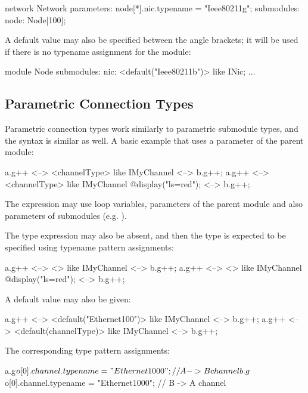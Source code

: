 \begin{ned}
network Network
{
    parameters:
        node[*].nic.typename = "Ieee80211g";
    submodules:
        node: Node[100];
}
\end{ned}

A default value may also be specified between the angle brackets;
it will be used if there is no typename assignment for the
module:

\begin{ned}
module Node
{
    submodules:
        nic: <default("Ieee80211b")> like INic;
        ...
}
\end{ned}


\subsection{Parametric Connection Types}
\label{sec:ch-ned-lang:connection-like}

Parametric connection types work similarly to parametric submodule types,
and the syntax is similar as well. A basic example that uses a parameter of
the parent module:

\begin{ned}
a.g++ <--> <channelType> like IMyChannel <--> b.g++;
a.g++ <--> <channelType> like IMyChannel {@display("ls=red");} <--> b.g++;
\end{ned}

The expression may use loop variables, parameters of the parent module
and also parameters of submodules (e.g. ).

The type expression may also be absent, and then the type is expected to be
specified using typename pattern assignments:

\begin{ned}
a.g++ <--> <> like IMyChannel <--> b.g++;
a.g++ <--> <> like IMyChannel {@display("ls=red");} <--> b.g++;
\end{ned}

A default value may also be given:

\begin{ned}
a.g++ <--> <default("Ethernet100")> like IMyChannel <--> b.g++;
a.g++ <--> <default(channelType)> like IMyChannel <--> b.g++;
\end{ned}

The corresponding type pattern assignments:

\begin{ned}
a.g$o[0].channel.typename = "Ethernet1000";  // A -> B channel
b.g$o[0].channel.typename = "Ethernet1000";  // B -> A channel
\end{ned}



